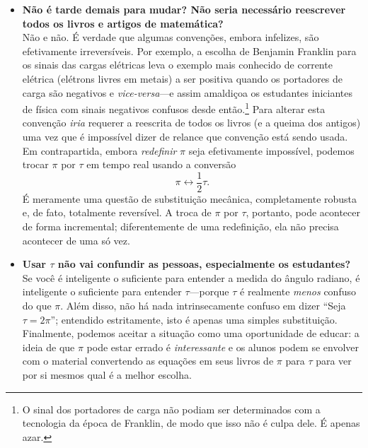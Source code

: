 \begin{itemize}
  \item \textbf{Não é tarde demais para mudar? Não seria necessário reescrever todos os livros e artigos de matemática?} \\ Não e não. É verdade que algumas convenções, embora infelizes, são efetivamente irreversíveis. Por exemplo, a escolha de Benjamin Franklin para os sinais das cargas elétricas leva o exemplo mais conhecido de corrente elétrica (elétrons livres em metais) a ser positiva quando os portadores de carga são negativos e \emph{vice-versa}---e assim amaldiçoa os estudantes iniciantes de física com sinais negativos confusos desde então.\footnote{O sinal dos portadores de carga não podiam ser determinados com a tecnologia da época de Franklin, de modo que isso não é culpa dele. É apenas azar.} Para alterar esta convenção \emph{iria} requerer a reescrita de todos os livros (e a queima dos antigos) uma vez que é impossível dizer de relance que convenção está sendo usada. Em contrapartida, embora \emph{redefinir} $\pi$ seja efetivamente impossível, podemos trocar $\pi$ por $\tau$ em tempo real usando a conversão \[ \pi \leftrightarrow \textstyle{\frac{1}{2}}\tau. \] É meramente uma questão de substituição mecânica, completamente robusta e, de fato, totalmente reversível. A troca de $\pi$ por $\tau$, portanto, pode acontecer de forma incremental; diferentemente de uma redefinição, ela não precisa acontecer de uma só vez.

  \item \textbf{Usar $\tau$ não vai confundir as pessoas, especialmente os estudantes?} \\ Se você é inteligente o suficiente para entender a medida do ângulo radiano, é inteligente o suficiente para entender $\tau$---porque $\tau$ é realmente \emph{menos} confuso do que $\pi$. Além disso, não há nada intrinsecamente confuso em dizer ``Seja $\tau = 2\pi$''; entendido estritamente, isto é apenas uma simples substituição. Finalmente, podemos aceitar a situação como uma oportunidade de educar: a ideia de que $\pi$ pode estar errado é \emph{interessante} e os alunos podem se envolver com o material convertendo as equações em seus livros de $\pi$ para $\tau$ para ver por si mesmos qual é a melhor escolha.


\end{itemize}

